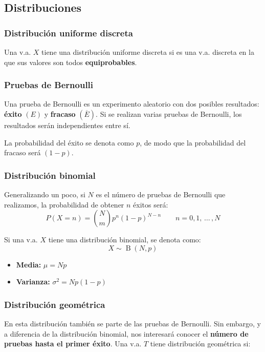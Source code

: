 \documentclass[a4paper]{book}
\numberwithin{figure}{section}
\numberwithin{equation}{subsection}
\numberwithin{figure}{chapter}
\theoremstyle{definition}
\newcommand{\psus}{\, \ldots \,}
\DeclareMathOperator{\B}{B}
\begin{document}
\subsection{Distribuciones}

\subsubsection{Distribución uniforme discreta}
Una v.a. $X$ tiene una distribución uniforme discreta si es una v.a. discreta en la que sus valores son todos \textbf{equiprobables}.

\subsubsection{Pruebas de Bernoulli}
Una prueba de Bernoulli es un experimento aleatorio con dos posibles resultados: \textbf{éxito} $(E)$ y \textbf{fracaso} $(\overline{E})$. Si se realizan varias pruebas de Bernoulli, los resultados serán independientes entre sí.

La probabilidad del éxito se denota como $p$, de modo que la probabilidad del fracaso será $(1-p)$.

\subsubsection{Distribución binomial}
Generalizando un poco, si $N$ es el número de pruebas de Bernoulli que realizamos, la probabilidad de obtener $n$ éxitos será: \[\boxed{P\left( X=n \right)={\binom{N}{m}} p^n\left( 1-p \right)^{N-n}} \qquad n= 0,1,\psus , N\]

Si una v.a. $X$ tiene una distribución binomial, se denota como: \[X \sim \B \left( N,p \right)\]

\begin{itemize}
	\item \textbf{Media:} $\mu = Np$
	\item \textbf{Varianza:} $\sigma ^2 = Np(1-p)$
\end{itemize}

\subsubsection{Distribución geométrica}
En esta distribución también se parte de las pruebas de Bernoulli. Sin embargo, y a diferencia de la distribución binomial, nos interesará conocer el \textbf{número de pruebas hasta el primer éxito}. Una v.a. $T$ tiene distribución geométrica si:
\end{document}
